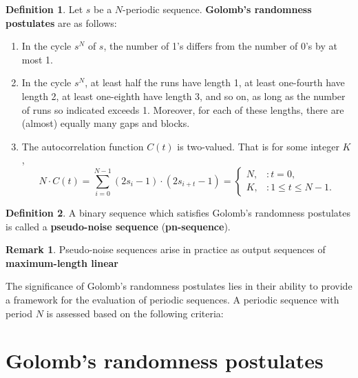 \documentclass[12pt,openany]{book}
\theoremstyle{definition}
\newtheorem{definition}{Definition}[chapter]
\newtheorem{remark}{Remark}[chapter]
\begin{document}
	\begin{tcolorbox}[colback=white,colframe=defcolor,arc=5pt,title={\color{white}\bf Golomb's randomness postulates}]
		\begin{definition}
			Let \( s \) be a $N$-periodic sequence. \textbf{Golomb's randomness postulates} are as follows:
			\begin{enumerate}[\textbf{R}1]
				\item In the cycle \( s^N \) of \( s \), the number of 1’s differs from the number of 0’s by at most 1.
				\item In the cycle \( s^N \), at least half the runs have length 1, at least one-fourth have length 2, at least one-eighth have length 3, and so on, as long as the number of runs so indicated exceeds 1. Moreover, for each of these lengths, there are (almost) equally many gaps and blocks.
				\item The autocorrelation function \( C(t) \) is two-valued. That is for some integer \( K \),
				\[
				N \cdot C(t) = \sum_{i=0}^{N-1}(2s_i - 1) \cdot (2s_{i+t} - 1)=
				\begin{cases} 
					N, & : t = 0, \\
					K, & : 1 \leq t \leq N - 1.
				\end{cases}
				\]
			\end{enumerate}
		\end{definition}
	\end{tcolorbox}
	
	\begin{tcolorbox}[colback=white,colframe=defcolor,arc=5pt,title={\color{white}\bf \textbf{Pseudo-Noise Sequence} (\textbf{pn-sequence})}]
		\begin{definition}
			A binary sequence which satisfies Golomb's randomness postulates is called a \textbf{pseudo-noise sequence} (\textbf{pn-sequence}).
		\end{definition}
	\end{tcolorbox}
	\begin{remark}
		Pseudo-noise sequences arise in practice as output sequences of \textbf{maximum-length linear }
	\end{remark}
	
	The significance of Golomb’s randomness postulates lies in their ability to provide a framework for the evaluation of periodic sequences. A periodic sequence with period \( N \) is assessed based on the following criteria:
	\section*{Golomb’s randomness postulates}
	
\end{document}
